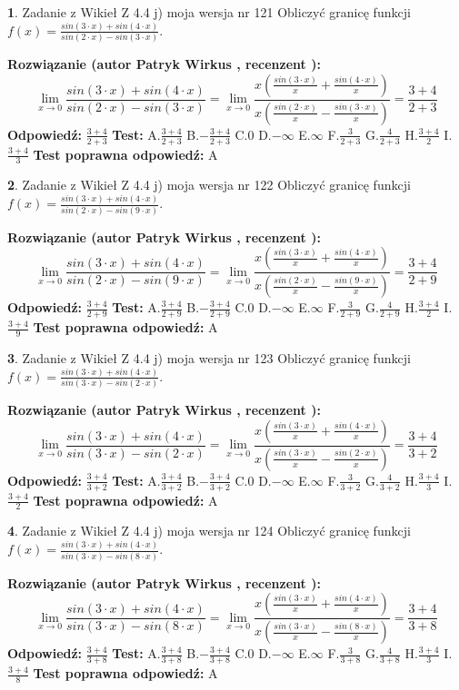 \documentclass[12pt, a4paper]{article}
\theoremstyle{definition} %
\newtheorem{zad}{}
\newcommand{\zadStart}[1]{\begin{zad}#1\newline}
\newcommand{\zadStop}{\end{zad}}
\newcommand{\rozwStart}[2]{\noindent \textbf{Rozwiązanie (autor #1 , recenzent #2): }\newline}
\newcommand{\rozwStop}{\newline}
\newcommand{\odpStart}{\noindent \textbf{Odpowiedź:}\newline}
\newcommand{\odpStop}{\newline}
\newcommand{\testStart}{\noindent \textbf{Test:}\newline}
\newcommand{\testStop}{\newline}
\newcommand{\kluczStart}{\noindent \textbf{Test poprawna odpowiedź:}\newline}
\newcommand{\kluczStop}{\newline}
\begin{document}
\zadStart{Zadanie z Wikieł Z 4.4 j) moja wersja nr 121}
Obliczyć granicę funkcji $f(x)=\frac{sin(3\cdot x) +sin(4\cdot x)}{sin(2\cdot x) -sin(3\cdot x)}$.
\zadStop
\rozwStart{Patryk Wirkus}{}
$$\lim\limits_{x\to 0}\frac{sin(3\cdot x) +sin(4\cdot x)}{sin(2\cdot x) -sin(3\cdot x)}=\lim\limits_{x\to 0}\frac{x(\frac{sin(3\cdot x)}{x}+\frac{sin(4\cdot x)}{x})}{x(\frac{sin(2\cdot x)}{x}-\frac{sin(3\cdot x)}{x})}=\frac{3+4}{2+3}$$
\rozwStop
\odpStart
$\frac{3+4}{2+3}$
\odpStop
\testStart
A.$\frac{3+4}{2+3}$
B.$-\frac{3+4}{2+3}$
C.$0$
D.$-\infty$
E.$\infty$
F.$\frac{3}{2+3}$
G.$\frac{4}{2+3}$
H.$\frac{3+4}{2}$
I.$\frac{3+4}{3}$
\testStop
\kluczStart
A
\kluczStop



\zadStart{Zadanie z Wikieł Z 4.4 j) moja wersja nr 122}
Obliczyć granicę funkcji $f(x)=\frac{sin(3\cdot x) +sin(4\cdot x)}{sin(2\cdot x) -sin(9\cdot x)}$.
\zadStop
\rozwStart{Patryk Wirkus}{}
$$\lim\limits_{x\to 0}\frac{sin(3\cdot x) +sin(4\cdot x)}{sin(2\cdot x) -sin(9\cdot x)}=\lim\limits_{x\to 0}\frac{x(\frac{sin(3\cdot x)}{x}+\frac{sin(4\cdot x)}{x})}{x(\frac{sin(2\cdot x)}{x}-\frac{sin(9\cdot x)}{x})}=\frac{3+4}{2+9}$$
\rozwStop
\odpStart
$\frac{3+4}{2+9}$
\odpStop
\testStart
A.$\frac{3+4}{2+9}$
B.$-\frac{3+4}{2+9}$
C.$0$
D.$-\infty$
E.$\infty$
F.$\frac{3}{2+9}$
G.$\frac{4}{2+9}$
H.$\frac{3+4}{2}$
I.$\frac{3+4}{9}$
\testStop
\kluczStart
A
\kluczStop



\zadStart{Zadanie z Wikieł Z 4.4 j) moja wersja nr 123}
Obliczyć granicę funkcji $f(x)=\frac{sin(3\cdot x) +sin(4\cdot x)}{sin(3\cdot x) -sin(2\cdot x)}$.
\zadStop
\rozwStart{Patryk Wirkus}{}
$$\lim\limits_{x\to 0}\frac{sin(3\cdot x) +sin(4\cdot x)}{sin(3\cdot x) -sin(2\cdot x)}=\lim\limits_{x\to 0}\frac{x(\frac{sin(3\cdot x)}{x}+\frac{sin(4\cdot x)}{x})}{x(\frac{sin(3\cdot x)}{x}-\frac{sin(2\cdot x)}{x})}=\frac{3+4}{3+2}$$
\rozwStop
\odpStart
$\frac{3+4}{3+2}$
\odpStop
\testStart
A.$\frac{3+4}{3+2}$
B.$-\frac{3+4}{3+2}$
C.$0$
D.$-\infty$
E.$\infty$
F.$\frac{3}{3+2}$
G.$\frac{4}{3+2}$
H.$\frac{3+4}{3}$
I.$\frac{3+4}{2}$
\testStop
\kluczStart
A
\kluczStop



\zadStart{Zadanie z Wikieł Z 4.4 j) moja wersja nr 124}
Obliczyć granicę funkcji $f(x)=\frac{sin(3\cdot x) +sin(4\cdot x)}{sin(3\cdot x) -sin(8\cdot x)}$.
\zadStop
\rozwStart{Patryk Wirkus}{}
$$\lim\limits_{x\to 0}\frac{sin(3\cdot x) +sin(4\cdot x)}{sin(3\cdot x) -sin(8\cdot x)}=\lim\limits_{x\to 0}\frac{x(\frac{sin(3\cdot x)}{x}+\frac{sin(4\cdot x)}{x})}{x(\frac{sin(3\cdot x)}{x}-\frac{sin(8\cdot x)}{x})}=\frac{3+4}{3+8}$$
\rozwStop
\odpStart
$\frac{3+4}{3+8}$
\odpStop
\testStart
A.$\frac{3+4}{3+8}$
B.$-\frac{3+4}{3+8}$
C.$0$
D.$-\infty$
E.$\infty$
F.$\frac{3}{3+8}$
G.$\frac{4}{3+8}$
H.$\frac{3+4}{3}$
I.$\frac{3+4}{8}$
\testStop
\kluczStart
A
\kluczStop
\end{document}
